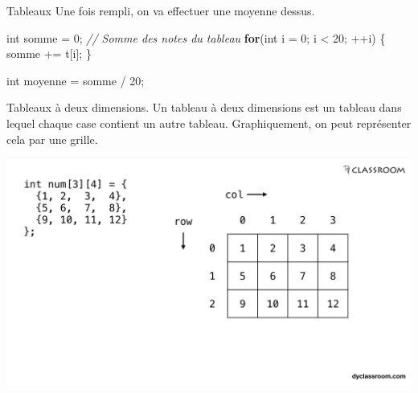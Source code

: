 \documentclass[
  10pt,
  french,
  ignorenonframetext,
  aspectratio=169,
]{beamer}
\newenvironment{Shaded}{}{}
\newcommand{\CommentTok}[1]{\textcolor[rgb]{0.38,0.63,0.69}{\textit{#1}}}
\newcommand{\ControlFlowTok}[1]{\textcolor[rgb]{0.00,0.44,0.13}{\textbf{#1}}}
\newcommand{\DataTypeTok}[1]{\textcolor[rgb]{0.56,0.13,0.00}{#1}}
\newcommand{\DecValTok}[1]{\textcolor[rgb]{0.25,0.63,0.44}{#1}}
\newcommand{\NormalTok}[1]{#1}
\newcommand{\OperatorTok}[1]{\textcolor[rgb]{0.40,0.40,0.40}{#1}}
\begin{document}
\begin{frame}[fragile]{Tableaux}
\protect\hypertarget{tableaux-1}{}
Une fois rempli, on va effectuer une moyenne dessus.

\begin{Shaded}
\begin{Highlighting}[]
\DataTypeTok{int}\NormalTok{ somme }\OperatorTok{=} \DecValTok{0}\OperatorTok{;} \CommentTok{// Somme des notes du tableau}
\ControlFlowTok{for}\OperatorTok{(}\DataTypeTok{int}\NormalTok{ i }\OperatorTok{=} \DecValTok{0}\OperatorTok{;}\NormalTok{ i }\OperatorTok{\textless{}} \DecValTok{20}\OperatorTok{;} \OperatorTok{++}\NormalTok{i}\OperatorTok{)} \OperatorTok{\{}
\NormalTok{     somme }\OperatorTok{+=}\NormalTok{ t}\OperatorTok{[}\NormalTok{i}\OperatorTok{];}
\OperatorTok{\}}

\DataTypeTok{int}\NormalTok{ moyenne }\OperatorTok{=}\NormalTok{ somme }\OperatorTok{/} \DecValTok{20}\OperatorTok{;}   
\end{Highlighting}
\end{Shaded}
\end{frame}

\begin{frame}{Tableaux à deux dimensions.}
\protect\hypertarget{tableaux-uxe0-deux-dimensions.}{}
Un tableau à deux dimensions est un tableau dans lequel chaque case
contient un autre tableau. Graphiquement, on peut représenter cela par
une grille.

\includegraphics{img/arr.png}
\end{frame}
\end{document}
